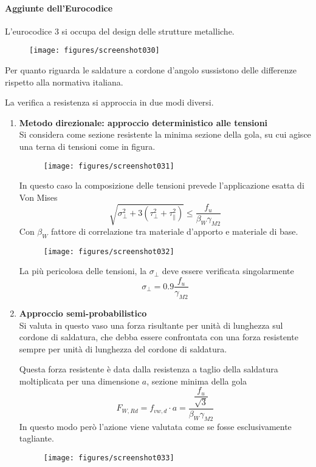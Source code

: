 \documentclass[a4paper, 15pt]{article}
\begin{document}
\paragraph{Aggiunte dell'Eurocodice}
\begin{adjustwidth}{2in}{} 	
	L'eurocodice 3 si occupa del design delle strutture metalliche. 
	\begin{figure}[H]
		\centering
		\texttt{[image: figures/screenshot030]}
		\label{fig:screenshot030}
	\end{figure}
	Per quanto riguarda le saldature a cordone d'angolo sussistono delle differenze rispetto alla normativa italiana. \newline 
	
	La verifica a resistenza si approccia in due modi diversi. 
	\begin{enumerate}
		\item \textbf{Metodo direzionale: approccio deterministico alle tensioni} \\
		Si considera come sezione resistente la minima sezione della gola, su cui agisce una terna di tensioni come in figura. \newline
		\begin{figure}[htp!]
			\centering
			\texttt{[image: figures/screenshot031]}
			\label{fig:screenshot031}
		\end{figure}
		In questo caso la composizione delle tensioni prevede l'applicazione esatta di Von Mises
		\[\sqrt{\sigma_{\perp}^2 + 3(\tau_{\perp}^2 + \tau_{\parallel}^2)}\leq\dfrac{f_u}{\beta_W\gamma_{M2}}\]
		Con $\beta_W$ fattore  di correlazione tra materiale d'apporto e materiale di base. 
		\begin{figure}[H]
			\centering
			\texttt{[image: figures/screenshot032]}
			\label{fig:screenshot032}
		\end{figure}
		La più pericolosa delle tensioni, la $\sigma_{\perp}$ deve essere verificata singolarmente
		\[\sigma_{\perp} = 0.9\dfrac{f_u}{\gamma_{M2}}\] 
		
		\item \textbf{Approccio semi-probabilistico}\\
		Si valuta in questo vaso una forza risultante per unità di lunghezza sul cordone di saldatura, che debba essere confrontata con una forza resistente sempre per unità di lunghezza del cordone di saldatura. \newline 
		
		Questa forza resistente è data dalla resistenza a taglio della saldatura moltiplicata per una dimensione $a$, sezione minima della gola
		\[F_{W,Rd} = f_{vw,d}\cdot a = \dfrac{\dfrac{f_u}{\sqrt{3}}}{\beta_W\gamma_{M2}}\]			
		In 	questo modo però l'azione viene valutata come se fosse esclusivamente tagliante.
		\begin{figure}[H]
			\centering
			\texttt{[image: figures/screenshot033]}
			\label{fig:screenshot033}
		\end{figure}		 	
	\end{enumerate}
\end{adjustwidth}
\newpage
\end{document}
